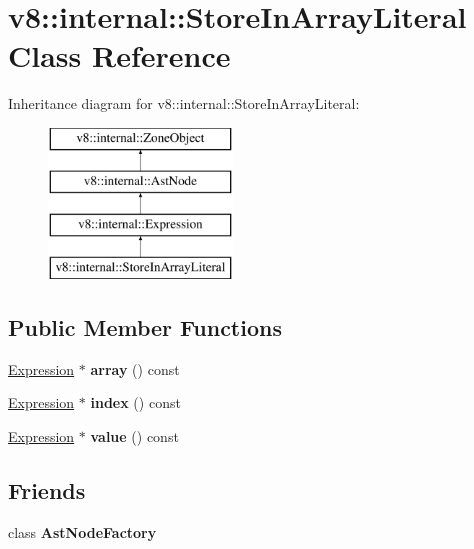 \hypertarget{classv8_1_1internal_1_1StoreInArrayLiteral}{}\section{v8\+:\+:internal\+:\+:Store\+In\+Array\+Literal Class Reference}
\label{classv8_1_1internal_1_1StoreInArrayLiteral}
Inheritance diagram for v8\+:\+:internal\+:\+:Store\+In\+Array\+Literal\+:\begin{figure}[H]
\begin{center}
\leavevmode
\includegraphics[height=4.000000cm]{classv8_1_1internal_1_1StoreInArrayLiteral}
\end{center}
\end{figure}
\subsection*{Public Member Functions}
\begin{DoxyCompactItemize}
\item 
\mbox{\label{classv8_1_1internal_1_1StoreInArrayLiteral_ae251e881669afbd80e118eb80f0cd228}} 
\mbox{\hyperlink{classv8_1_1internal_1_1Expression}{Expression}} $\ast$ {\bfseries array} () const
\item 
\mbox{\label{classv8_1_1internal_1_1StoreInArrayLiteral_a9a29c89a6cf91ef91ad27451bed95bdd}} 
\mbox{\hyperlink{classv8_1_1internal_1_1Expression}{Expression}} $\ast$ {\bfseries index} () const
\item 
\mbox{\label{classv8_1_1internal_1_1StoreInArrayLiteral_a81a1a852547f8186823a6f2b776b3230}} 
\mbox{\hyperlink{classv8_1_1internal_1_1Expression}{Expression}} $\ast$ {\bfseries value} () const
\end{DoxyCompactItemize}
\subsection*{Friends}
\begin{DoxyCompactItemize}
\item 
\mbox{\label{classv8_1_1internal_1_1StoreInArrayLiteral_a8d587c8ad3515ff6433eb83c578e795f}} 
class {\bfseries Ast\+Node\+Factory}
\end{DoxyCompactItemize}
